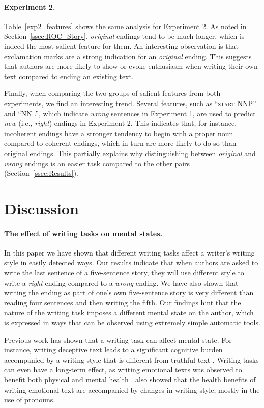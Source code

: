\documentclass[11pt,a4paper]{article}
\newcommand{\secref}[1]{Section~\ref{ssec:#1}}
\newcommand{\tabref}[1]{Table~\ref{#1}}
\newcommand{\isectionb}[1]{\section{#1}\label{ssec:#1}}
\begin{document}
\paragraph{Experiment 2.}
\tabref{exp2_features} shows the same analysis for Experiment 2.
As noted in \secref{ROC_Story}, {\it original} endings tend to be much longer, which is indeed the most salient feature for them.
An interesting observation is that exclamation marks are a strong
indication for an  {\it original} ending. 
This suggests that authors are more likely to show or evoke enthusiasm when writing their own text compared to ending an existing text.

Finally, when comparing the two groups of salient features from both experiments, we find an interesting trend.
Several features, such as ``\textsc{start} NNP'' and  ``NN .'', which indicate {\it wrong} sentences in Experiment 1, are used to predict {\it new} (i.e., {\it right}) endings in Experiment 2. 
This indicates that, for instance, incoherent endings have a stronger tendency to begin with a proper noun compared to coherent endings, 
which in turn are more likely to do so than original endings. 
This partially explains why distinguishing between {\it original} and {\it wrong} endings is an easier task compared to the other pairs (\secref{Results}).


\isectionb{Discussion}

\paragraph{The effect of writing tasks on mental states.}
In this paper we have shown that different writing tasks affect a writer's writing style in easily detected ways.
Our results indicate that when authors are asked to write the last
sentence of a five-sentence story, they will use different style to
write a {\it right} ending compared to a {\it wrong} ending. We have
also shown that writing the ending as part of one's own five-sentence story is very different than reading four sentences and then writing the fifth.
Our findings hint that the nature of the writing task imposes a
different mental state on the author, which is expressed in ways that can be observed using extremely simple automatic tools. 

Previous work has shown that a writing task can affect mental state.
For instance, writing deceptive text leads to a significant cognitive
burden accompanied by a writing style that is different from truthful
text \cite{Newman:2003,Banerjee:2014}.
Writing tasks can even have a long-term effect,
as writing emotional texts was observed to benefit both physical and mental health \cite{Lepore:2002,Frattaroli:2006}. 
\citet{Campbell:2003} also showed that the health benefits of writing emotional text are accompanied by changes in writing style, mostly in the use of pronouns.
\end{document}

